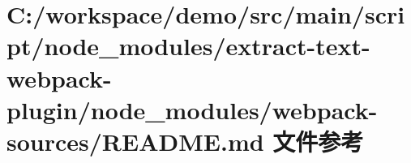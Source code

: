 \hypertarget{node__modules_2extract-text-webpack-plugin_2node__modules_2webpack-sources_2_r_e_a_d_m_e_8md}{}\section{C\+:/workspace/demo/src/main/script/node\+\_\+modules/extract-\/text-\/webpack-\/plugin/node\+\_\+modules/webpack-\/sources/\+R\+E\+A\+D\+ME.md 文件参考}
\label{node__modules_2extract-text-webpack-plugin_2node__modules_2webpack-sources_2_r_e_a_d_m_e_8md}
